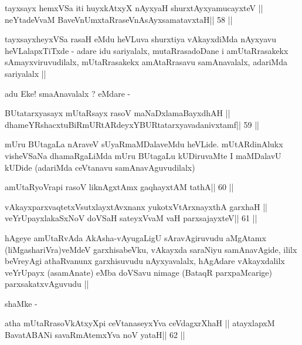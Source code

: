 \begin{shl}
tayxsayx hemxVSa iti huyxkAtxyX nAyxyaH shurxtAyx\s yamucayxteV ||
neYtadeVvaM BaveVnUmxtaRraseVnAsAyxsamatavxtaH\hfill || 58 ||
\end{shl}

\begin{artha}
tayxsayxheyxVSa rasaH eMdu heVLuva shurxtiya vAkayxdiMda nAyxyavu
heVLalapxTiTxde - adare idu sariyalalx, mutaRrasadoDane i
amUtaRrasakekx sAmayxviruvudilalx, mUtaRrasakekx amAtaRrasavu
samAnavalalx, adariMda sariyalalx ||

adu Eke! smaAnavalalx ? eMdare -
\end{artha}

\begin{shl}
BUtatarxyasayx mUtaRsayx rasoV maNaDxlamaBayxdhAH ||
dhameYRshacxtuBiRmURtARdeyxYBURtatarxyavadanivxtamf\hfill || 59 ||
\end{shl}

\begin{artha}
mUru BUtagaLa nAraveV sUyaRmaMDalaveMdu heVLide. mUtARdinAlukx
visheVSaNa dhamaRgaLiMda mUru BUtagaLu kUDiruvaMte I maMDalavU kUDide
(adariMda ceVtanavu samAnavAguvudilalx)
\end{artha}

\begin{shl}
\footnotemark[1]amUtaRyoVrapi rasoV liknAgxtAmx gaqhayxtAM tathA\hfill || 60 ||
\end{shl}

\begin{shl}
vAkayxparxvaqtetxVsutxlayxtAvxnanx yukotxV\s tArxnayxthA garxhaH ||
veYrUpayxlakaSxNoV doVSaH sateyxVvaM vaH parxsajayxteV\hfill || 61 ||
\end{shl}

\begin{artha}
hAgeye amUtaRvAda AkAsha-vAyugaLigU sAravAgiruvudu aMgAtamx
(liMgashariVra)veMdeV garxhisabeVku, vAkayxda saraNiyu samAnavAgide,
ililx beVreyAgi athaRvanunx garxhisuvudu nAyxyavalalx, hAgAdare
vAkayxdalilx veYrUpayx (asamAnate) eMba doVSavu nimage (BataqR
parxpaMcarige) parxsakatxvAguvudu ||

shaMke -
\end{artha}

\begin{shl}
atha mUtaRrasoVkAtxyX\s pi ceVtanaseyxYva ceVdagxrXhaH ||
atayxlapxM BavatA\s BANi savaRmAtemxYva noV yataH\hfill || 62 ||
\end{shl}

